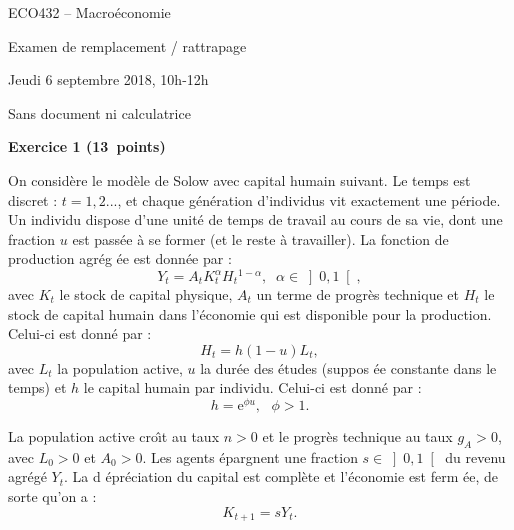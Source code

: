 \documentclass[a4paper,11pt]{article}
\begin{document}
ECO432 -- Macro\'{e}conomie

Examen de remplacement / rattrapage

Jeudi 6 septembre 2018, 10h-12h

\begin{center}
\bigskip

Sans document ni calculatrice

\bigskip

\textbf{Exercice 1 (13\ points)}

\bigskip
\end{center}

On consid\`{e}re le mod\`{e}le de Solow avec capital humain suivant. Le
temps est discret : $t=1,2...$, et chaque g\'{e}n\'{e}ration d'individus vit
exactement une p\'{e}riode. Un individu dispose d'une unit\'{e} de temps de
travail au cours de sa vie, dont une fraction $u$ est pass\'{e}e \`{a} se
former (et le reste \`{a} travailler). La fonction de production agr\'{e}g%
\'{e}e est donn\'{e}e par :%
\begin{equation}
Y_{t}=A_{t}K_{t}^{\alpha }H_{t}{}^{1-\alpha },\;\;\alpha \in \left] 0,1%
\right[ ,  \label{Fonction de production}
\end{equation}%
avec $K_{t}$ le stock de capital physique, $A_{t}$ un terme de progr\`{e}s
technique et $H_{t}$ le stock de capital humain dans l'\'{e}conomie qui est
disponible pour la production. Celui-ci est donn\'{e} par :%
\begin{equation}
H_{t}=h\left( 1-u\right) L_{t},  \label{Travail efficace}
\end{equation}%
avec $L_{t}$ la population active, $u$ la dur\'{e}e des \'{e}tudes (suppos%
\'{e}e constante dans le temps) et $h$ le capital humain par individu.
Celui-ci est donn\'{e} par :%
\begin{equation}
h=\text{e}^{\phi u},\text{ }\phi >1.  \label{Capital humain par tete}
\end{equation}

La population active cro\^{\i}t au taux $n>0$ et le progr\`{e}s technique au
taux $g_{A}>0$, avec $L_{0}>0$ et $A_{0}>0$. Les agents \'{e}pargnent une
fraction $s\in \left] 0,1\right[ $ du revenu agr\'{e}g\'{e} $Y_{t}$. La d%
\'{e}pr\'{e}ciation du capital est compl\`{e}te et l'\'{e}conomie est ferm%
\'{e}e, de sorte qu'on a :%
\begin{equation*}
K_{t+1}=sY_{t}\text{.}
\end{equation*}

\bigskip
\end{document}
